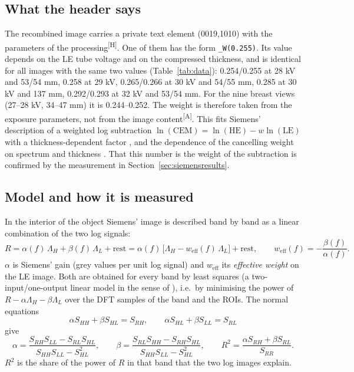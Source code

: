\documentclass[11pt,a4paper]{article}
\newcommand{\LL}{\Lambda_L}
\newcommand{\LH}{\Lambda_H}
\newcommand{\weff}{w_\mathrm{eff}}
\newcommand{\Hd}{\textsuperscript{[H]}}
\newcommand{\As}{\textsuperscript{[A]}}
\newcommand{\code}[1]{\texttt{#1}}
\begin{document}
\subsection{What the header says}\label{sec:header}
The recombined image carries a private text element (0019,1010) with the parameters of the processing\Hd. One of
them has the form \code{\_W(0.255)}. Its value depends on the LE tube voltage and on the compressed thickness, and
is identical for all images with the same two values (Table~\ref{tab:data}): 0.254/0.255 at 28 kV and 53/54 mm,
0.258 at 29 kV, 0.265/0.266 at 30 kV and 54/55 mm, 0.285 at 30 kV and 137 mm, 0.292/0.293 at 32 kV and 53/54 mm.
For the nine breast views (27--28 kV, 34--47 mm) it is 0.244--0.252. The weight is therefore taken from the exposure
parameters, not from the image content\As. This fits Siemens' description of a weighted log subtraction
$\ln(\mathrm{CEM})=\ln(\mathrm{HE})-w\ln(\mathrm{LE})$ \cite{korporaal2018} with a thickness-dependent factor
\cite{knogler2016}, and the dependence of the cancelling weight on spectrum and thickness \cite{carton2010}. That
this number is the weight of the subtraction is confirmed by the measurement in Section~\ref{sec:siemensresults}.

\subsection{Model and how it is measured}\label{sec:regression}
In the interior of the object Siemens' image is described band by band as a linear combination of the two log
signals:
\begin{equation}
R = \alpha(f)\,\LH + \beta(f)\,\LL + \text{rest}
  = \alpha(f)\,\big[\LH - \weff(f)\,\LL\big] + \text{rest}, \qquad \weff(f) = -\frac{\beta(f)}{\alpha(f)} .
\label{eq:model}
\end{equation}
$\alpha$ is Siemens' gain (grey values per unit log signal) and $\weff$ its \emph{effective weight} on the LE image.
Both are obtained for every band by least squares (a two-input/one-output linear model in the sense of
\cite[ch.~7]{bendat2010}), i.e.\ by minimising the power of $R-\alpha\LH-\beta\LL$ over the
DFT samples of the band and the ROIs. The normal equations
\begin{equation}
\alpha S_{HH}+\beta S_{HL}=S_{RH},\qquad \alpha S_{HL}+\beta S_{LL}=S_{RL}
\end{equation}
give
\begin{equation}
\alpha=\frac{S_{RH}S_{LL}-S_{RL}S_{HL}}{S_{HH}S_{LL}-S_{HL}^2},\qquad
\beta=\frac{S_{RL}S_{HH}-S_{RH}S_{HL}}{S_{HH}S_{LL}-S_{HL}^2},\qquad
R^2=\frac{\alpha S_{RH}+\beta S_{RL}}{S_{RR}} .
\label{eq:alphabeta}
\end{equation}
$R^2$ is the share of the power of $R$ in that band that the two log images explain.
\end{document}
